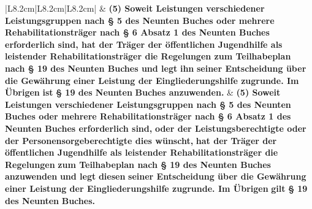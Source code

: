 \documentclass[10pt,a4paper,landscape]{article}
\begin{document}
\begin{longtable}{|L{8.2cm}|L{8.2cm}|L{8.2cm}|}
 & \textbf{(5) Soweit Leistungen verschiedener  \newline Leistungsgruppen nach \S{} 5 des Neunten  \newline Buches oder mehrere  \newline Rehabilitationsträger nach \S{} 6 Absatz 1  \newline des Neunten Buches erforderlich sind,  \newline hat der Träger der öffentlichen  \newline Jugendhilfe als leistender  \newline Rehabilitationsträger die Regelungen  \newline zum Teilhabeplan nach \S{} 19 des  \newline Neunten Buches und legt }\textbf{\textcolor{diffred}{ihn}}\textbf{ seiner  \newline Entscheidung über die Gewährung einer  \newline Leistung der Eingliederungshilfe  \newline zugrunde. Im Übrigen }\textbf{\textcolor{diffred}{ist}}\textbf{ \S{} 19 des  \newline Neunten }\textbf{\textcolor{diffred}{Buches anzuwenden.}} & \textbf{(5) Soweit Leistungen verschiedener  \newline Leistungsgruppen nach \S{} 5 des Neunten  \newline Buches oder mehrere  \newline Rehabilitationsträger nach \S{} 6 Absatz 1  \newline des Neunten Buches erforderlich sind,} \newline \textbf{\textcolor{diffgreen}{oder der Leistungsberechtigte oder der  \newline Personensorgeberechtigte dies  \newline wünscht,}}\textbf{ hat der Träger der öffentlichen  \newline Jugendhilfe als leistender  \newline Rehabilitationsträger die Regelungen } \textbf{zum Teilhabeplan nach \S{} 19 des  \newline Neunten Buches }\textbf{\textcolor{diffgreen}{anzuwenden}}\textbf{ und legt} \newline \textbf{\textcolor{diffgreen}{diesen}}\textbf{ seiner Entscheidung über die  \newline Gewährung einer Leistung der  \newline Eingliederungshilfe zugrunde. Im  \newline Übrigen }\textbf{\textcolor{diffgreen}{gilt}}\textbf{ \S{} 19 des Neunten }\textbf{\textcolor{diffgreen}{Buches.}} \\

\end{longtable}
\end{document}
